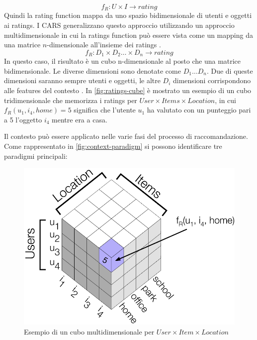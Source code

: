 \documentclass[12pt,italian]{report}
\begin{document}
$$
f_R : U \times I \rightarrow rating
$$
Quindi la rating function mappa da uno spazio bidimensionale di utenti e oggetti ai ratings.
I CARS generalizzano questo approccio utilizzando un approccio multidimensionale in cui la ratings function può essere vista come un mapping da una matrice $n$-dimensionale all'insieme dei ratings \cite{survey-mattia}.
$$
f_R : D_1 \times D_2 \dots \times D_n \rightarrow rating
$$
In questo caso, il risultato è un cubo n-dimensionale al posto che una matrice bidimensionale. Le diverse dimensioni sono denotate come $D_1 \dots D_n$. Due di queste dimensioni saranno sempre utenti e oggetti, le altre $D_i$ dimensioni corrispondono alle features del contesto \cite{recsys-book}. In \autoref{fig:ratings-cube} è mostrato un esempio di un cubo tridimensionale che memorizza i ratings per $User \times Items \times Location$, in cui $f_R(u_1, i_4, home) = 5$ significa che l'utente $u_1$ ha valutato con un punteggio pari a 5 l'oggetto $i_4$ mentre era a casa.

Il contesto può essere applicato nelle varie fasi del processo di raccomandazione. Come rappresentato in \autoref{fig:context-paradigm} si possono identificare tre paradigmi principali:

\begin{figure}
  \centering
  \includegraphics[scale=0.80]{immagini/rating_cube.png}
  \caption{Esempio di un cubo multidimensionale per $User \times Item \times Location$}
  \label{fig:ratings-cube}
\end{figure}
\end{document}
